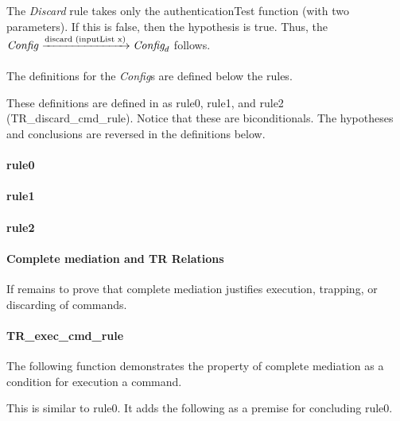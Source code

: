 \documentclass[../../main/main.tex]{subfiles}
\begin{document}
The \textit{Discard} rule takes only the authenticationTest function (with two parameters).  If this is false, then the hypothesis is true.  Thus, the  $\text{\textit{Config}}  \xrightarrow[\text{}]{\text{discard (inputList x)}} \textit{Config}_d$ follows.

The definitions for the \textit{Config}s are defined below the rules. 

These definitions are defined in  as rule0, rule1, and rule2 (TR_discard_cmd_rule).  Notice that these are biconditionals.  The hypotheses and conclusions are reversed in the definitions below.  

\paragraph*{rule0}
\HOLssmTheoremsTRruleZero



\paragraph*{rule1}
\HOLssmTheoremsTRruleOne

\paragraph*{rule2}


\HOLssmTheoremsTRXXdiscardXXcmdXXrule


\paragraph*{Complete mediation and TR Relations}
If remains to prove that complete mediation justifies execution, trapping, or discarding of commands. 

\paragraph*{TR_exec_cmd_rule}
The following function demonstrates the property of complete mediation as a condition for execution a command.


\HOLssmTheoremsTRXXexecXXcmdXXrule

This is similar to rule0.  It adds the following as a premise for concluding rule0.
\end{document}

